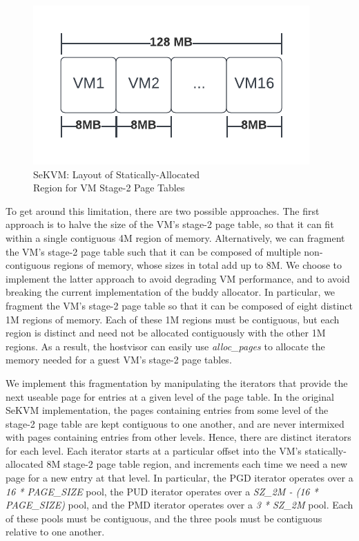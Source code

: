 \begin{figure}[h!tbp]
\centering
\captionsetup{justification=centering}
\includegraphics{sekvm_vm_region}
\caption{SeKVM: Layout of Statically-Allocated\\Region for VM Stage-2 Page Tables}
\label{fig:sekvmvmregions}
\end{figure}

\bigskip To get around this limitation, there are two possible approaches. The first approach
is to halve the size of the VM's stage-2 page table, so that it can fit within
a single contiguous 4M region of memory. Alternatively, we can fragment the VM's stage-2
page table such that it can be composed of multiple non-contiguous regions of memory, whose sizes in total add up to 8M. We
choose to implement the latter approach to avoid degrading VM performance, and to avoid
breaking the current implementation of the buddy allocator. In
particular, we fragment the VM's stage-2 page table so that it can be composed
of eight distinct 1M regions of memory. Each of these 1M regions must be contiguous,
but each region is distinct and need not be allocated contiguously with the
other 1M regions. As a result, the hostvisor can easily use \textit{alloc\_pages}
to allocate the memory needed for a guest VM's stage-2 page tables.

We implement this fragmentation by manipulating the iterators that provide the next useable
page for entries at a given level of the page table. In the original SeKVM implementation, the pages containing entries from some level of the stage-2 page table are
kept contiguous to one another, and are never intermixed with pages containing entries from other levels. Hence, there are distinct iterators for each level.
Each iterator starts at a particular offset into the VM's statically-allocated 8M stage-2
page table region, and increments each time we need a new page for a new entry at that level. In particular, the PGD iterator operates over a \textit{16 * PAGE\_SIZE} pool, the PUD
iterator operates over a \textit{SZ\_2M - (16 * PAGE\_SIZE)} pool, and the PMD iterator operates over a \textit{3 * SZ\_2M} pool.
Each of these pools must be contiguous, and the three pools must be contiguous relative to one another.


